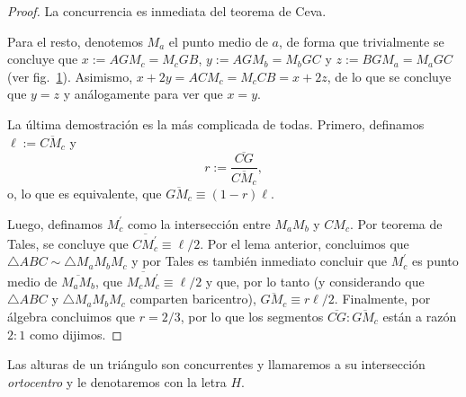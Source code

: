\documentclass[11pt,a4paper]{book}
\begin{document}
\begin{proof}
	La concurrencia es inmediata del teorema de Ceva.

	Para el resto, denotemos $M_a$ el punto medio de $a$, de forma que trivialmente se concluye que $x:=AGM_c=M_cGB$, $y:=AGM_b=M_bGC$ y $z:=BGM_a=M_aGC$ (ver fig.~\ref{fig:triangle-s-centroid}). Asimismo, $x+2y=ACM_c=M_cCB=x+2z$, de lo que se concluye que $y=z$ y análogamente para ver que $x=y$.
\begin{figure}
	\centering
	\caption{}\label{fig:triangle-s-centroid}
\end{figure}

	La última demostración es la más complicada de todas. Primero, definamos $\ell:=\overline{CM_c}$ y
	$$r:=\frac{\overline{CG}}{\overline{CM_c}},$$
	o, lo que es equivalente, que $\overline{GM_c}\equiv(1-r)\ell$.

	Luego, definamos $M_c^{\prime}$ como la intersección entre $M_aM_b$ y $CM_c$. Por teorema de Tales, se concluye que $\overline{CM_c^{\prime}}\equiv\ell/2$. Por el lema anterior, concluimos que $\triangle ABC\sim\triangle  M_aM_bM_c$ y por Tales es también inmediato concluir que $M_c^{\prime}$ es punto medio de $\overline{M_aM_b}$, que $ \overline{M_cM_c^{\prime}} \equiv\ell/2$ y que, por lo tanto (y considerando que $\triangle ABC$ y $\triangle M_aM_bM_c$ comparten baricentro), $\overline{GM_c} \equiv r\ell/2$. Finalmente, por álgebra concluimos que $r=2/3$, por lo que los segmentos $\overline{CG}:\overline{GM_c}$ están a razón $2:1$ como dijimos.
\end{proof}
\begin{thm}
	Las alturas de un triángulo son concurrentes y llamaremos a su intersección \textit{ortocentro} y le denotaremos con la letra $H$.
\end{thm}
\end{document}
